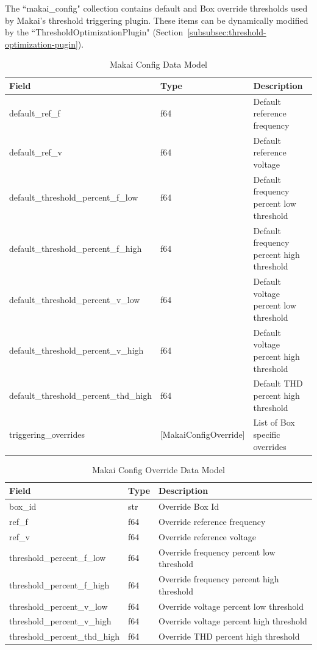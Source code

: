 The ``makai\_config" collection contains default and Box override thresholds used by Makai's threshold triggering plugin. These items can be dynamically modified by the ``ThresholdOptimizationPlugin" (Section~\ref{subsubsec:threshold-optimization-pugin}).

\begin{table}[H]
	\centering
	\caption{Makai Config Data Model}
	\begin{tabularx}{\textwidth}{XlX}
		\toprule
		\textbf{Field} & \textbf{Type} & \textbf{Description} \\
		\midrule
		default\_ref\_f & f64 & Default reference frequency \\
		default\_ref\_v & f64 & Default reference voltage \\
		default\_threshold\_percent\_f\_low & f64 & Default frequency percent low threshold \\
		default\_threshold\_percent\_f\_high & f64 & Default frequency percent high threshold \\
		default\_threshold\_percent\_v\_low & f64 & Default voltage percent low threshold \\
		default\_threshold\_percent\_v\_high & f64 & Default voltage percent high threshold \\
		default\_threshold\_percent\_thd\_high & f64 & Default THD percent high threshold \\
		triggering\_overrides & [MakaiConfigOverride] & List of Box specific overrides \\
		\bottomrule
	\end{tabularx}
	\label{table:makai_config}
\end{table}

\begin{table}[H]
	\centering
	\caption{Makai Config Override Data Model}
	\begin{tabularx}{\textwidth}{XlX}
		\toprule
		\textbf{Field} & \textbf{Type} & \textbf{Description} \\
		\midrule
		box\_id & str & Override Box Id \\
		ref\_f & f64 & Override reference frequency \\
		ref\_v & f64 & Override reference voltage \\
		threshold\_percent\_f\_low & f64 & Override frequency percent low threshold \\
		threshold\_percent\_f\_high & f64 & Override frequency percent high threshold \\
		threshold\_percent\_v\_low & f64 & Override voltage percent low threshold \\
		threshold\_percent\_v\_high & f64 & Override voltage percent high threshold \\
		threshold\_percent\_thd\_high & f64 & Override THD percent high threshold \\
		\bottomrule
	\end{tabularx}
	\label{table:makai_config_override}
\end{table}


